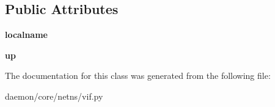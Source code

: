 \subsection*{Public Attributes}
\begin{DoxyCompactItemize}
\item 
\hypertarget{classcore_1_1netns_1_1vif_1_1_v_eth_a63087308cea98a5dacaeff3feb1fcb29}{{\bfseries localname}}\label{classcore_1_1netns_1_1vif_1_1_v_eth_a63087308cea98a5dacaeff3feb1fcb29}

\item 
\hypertarget{classcore_1_1netns_1_1vif_1_1_v_eth_a7efdaa9d4ce2945a2c7a661d0c3a09c1}{{\bfseries up}}\label{classcore_1_1netns_1_1vif_1_1_v_eth_a7efdaa9d4ce2945a2c7a661d0c3a09c1}

\end{DoxyCompactItemize}


The documentation for this class was generated from the following file\+:\begin{DoxyCompactItemize}
\item 
daemon/core/netns/vif.\+py\end{DoxyCompactItemize}
